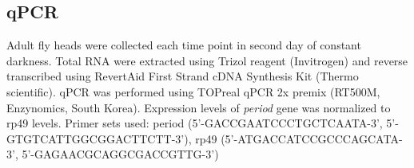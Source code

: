 \subsection*{qPCR}

Adult fly heads were collected each time point in second day of constant darkness.
Total RNA were extracted using Trizol reagent (Invitrogen) and reverse transcribed using RevertAid First Strand cDNA Synthesis Kit (Thermo scientific).
qPCR was performed using TOPreal qPCR 2x premix (RT500M, Enzynomics, South Korea). Expression levels of \emph{period} gene was normalized to rp49 levels.
Primer sets used: period (5'-GACCGAATCCCTGCTCAATA-3', 5'-GTGTCATTGGCGGACTTCTT-3'), rp49 (5'-ATGACCATCCGCCCAGCATA-3', 5'-GAGAACGCAGGCGACCGTTG-3')
    
  
